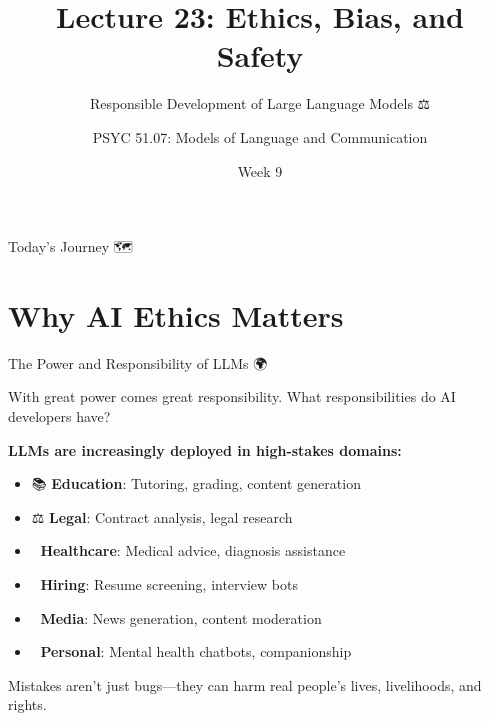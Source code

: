 \documentclass[aspectratio=169]{beamer}
\title{Lecture 23: Ethics, Bias, and Safety}
\subtitle{Responsible Development of Large Language Models ⚖️}
\author{PSYC 51.07: Models of Language and Communication}
\institute{Dr. Jeremy R. Manning}
\date{Week 9}
\begin{document}
\begin{frame}[shrink=10]
\titlepage
\end{frame}

\begin{frame}[shrink=5]{Today's Journey 🗺️}
\tableofcontents
\end{frame}

\section{Why AI Ethics Matters}

\begin{frame}[shrink=10]{The Power and Responsibility of LLMs 🌍}
\begin{discussionbox}
With great power comes great responsibility. What responsibilities do AI developers have?
\end{discussionbox}

\vspace{0.5em}

\textbf{LLMs are increasingly deployed in high-stakes domains:}
\begin{itemize}\setlength{\itemsep}{0pt}
    \item 📚 \textbf{Education}: Tutoring, grading, content generation
    \item ⚖️ \textbf{Legal}: Contract analysis, legal research
    \item 🏥 \textbf{Healthcare}: Medical advice, diagnosis assistance
    \item 💼 \textbf{Hiring}: Resume screening, interview bots
    \item 📰 \textbf{Media}: News generation, content moderation
    \item 💬 \textbf{Personal}: Mental health chatbots, companionship
\end{itemize}

\vspace{0.5em}

\begin{warningbox}
Mistakes aren't just bugs—they can harm real people's lives, livelihoods, and rights.
\end{warningbox}
\end{frame}
\end{document}
